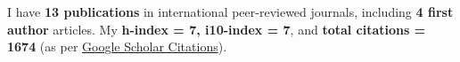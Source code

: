
I have \textbf{13 publications} in international peer-reviewed journals, including \textbf{4 first author} articles. My \textbf{h-index = 7, i10-index = 7}, and \textbf{total citations = 1674} (as per \href{https://scholar.google.com/citations?hl=en&user=6-7FYjIAAAAJ&authuser=2}{Google Scholar Citations}).

\nocite{*}


\printbibliography[heading={none},title={Journal Articles},type=article]



